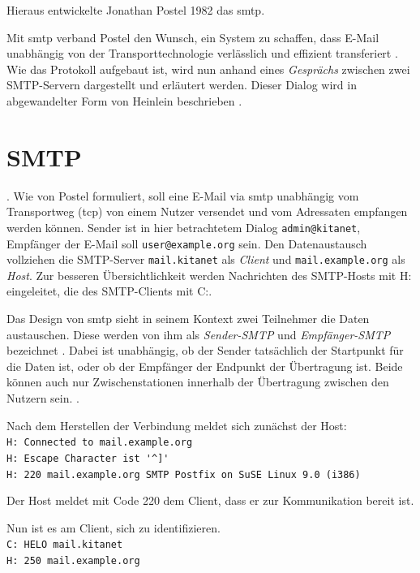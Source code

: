 Hieraus entwickelte Jonathan Postel 1982 das \acf{smtp}.

Mit \ac{smtp} verband Postel den Wunsch, ein System zu schaffen, dass E-Mail unabhängig von der Transporttechnologie verlässlich und effizient transferiert \citep[vgl.][1]{rfc821}. Wie das Protokoll aufgebaut ist, wird nun anhand eines \textit{Gesprächs} zwischen zwei SMTP-Servern dargestellt und erläutert werden. Dieser Dialog wird in abgewandelter Form von Heinlein beschrieben \citep[vgl.][S. 24 ff.]{Heinlein2004}. 

\section{SMTP}

 \citep[][11]{rfc821}.
Wie von Postel formuliert, soll eine E-Mail via \ac{smtp} unabhängig vom Transportweg (\zb \ac{tcp}) von einem Nutzer versendet und vom Adressaten empfangen werden können. Sender ist in hier betrachtetem Dialog \verb+admin@kitanet+, Empfänger der E-Mail soll \verb+user@example.org+ sein. Den Datenaustausch vollziehen die SMTP-Server \verb+mail.kitanet+ als \textit{Client} und \verb+mail.example.org+ als \textit{Host}. Zur besseren Übersichtlichkeit werden Nachrichten des SMTP-Hosts mit H: eingeleitet, die des SMTP-Clients mit C:.

Das Design von \ac{smtp} sieht in seinem Kontext zwei Teilnehmer die Daten austauschen. Diese werden von ihm als \textit{Sender-SMTP} und \textit{Empfänger-SMTP} bezeichnet \citep[vgl.][2]{rfc821}. Dabei ist unabhängig, ob der Sender tatsächlich der Startpunkt für die Daten ist, oder ob der Empfänger der Endpunkt der Übertragung ist. Beide können auch nur Zwischenstationen innerhalb der Übertragung zwischen den Nutzern sein.  \citep[][2]{rfc821}.

Nach dem Herstellen der Verbindung meldet sich zunächst der Host:\\
\verb+H: Connected to mail.example.org+ \\ 
\verb+H: Escape Character ist '^]'+ \\
\verb+H: 220 mail.example.org SMTP Postfix on SuSE Linux 9.0 (i386)+

Der Host meldet mit Code 220  \citep[][38]{rfc821} dem Client, dass er zur Kommunikation bereit ist. 

Nun ist es am Client, sich zu identifizieren. \\
\verb+C: HELO mail.kitanet+ \\ 
\verb+H: 250 mail.example.org+

